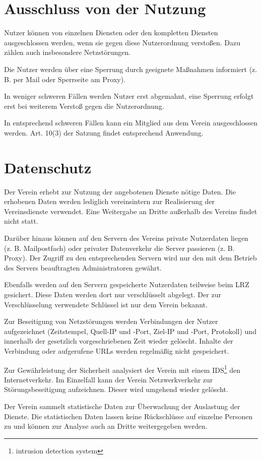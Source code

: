 \documentclass[a4paper,10pt]{scrartcl}
\begin{document}
\section{Ausschluss von der Nutzung}
Nutzer können von einzelnen Diensten oder den kompletten Diensten ausgeschlossen werden, wenn sie gegen diese Nutzerordnung verstoßen. Dazu zählen auch insbesondere Netzstörungen.

Die Nutzer werden über eine Sperrung durch geeignete Maßnahmen informiert (z. B. per Mail oder Sperrseite am Proxy).

In weniger schweren Fällen werden Nutzer erst abgemahnt, eine Sperrung erfolgt erst bei weiterem Verstoß gegen die Nutzerordnung.

In entsprechend schweren Fällen kann ein Mitglied aus dem Verein ausgeschlossen werden. Art. 10(3) der Satzung findet entsprechend Anwendung. 

\section{Datenschutz}
Der Verein erhebt zur Nutzung der angebotenen Dienste nötige Daten. Die erhobenen Daten werden lediglich vereinsintern zur Realisierung der Vereinsdienste verwendet. Eine Weitergabe an Dritte außerhalb des Vereins findet nicht statt.

Darüber hinaus können auf den Servern des Vereins private Nutzerdaten liegen (z. B. Mailpostfach) oder privater Datenverkehr die Server passieren (z. B. Proxy). Der Zugriff zu den entsprechenden Servern wird nur den mit dem Betrieb des Servers beauftragten Administratoren gewährt.

Ebenfalls werden auf den Servern gespeicherte Nutzerdaten teilweise beim LRZ gesichert. Diese Daten werden dort nur verschlüsselt abgelegt. Der zur Verschlüsselung verwendete Schlüssel ist nur dem Verein bekannt.

Zur Beseitigung von Netzstörungen werden Verbindungen der Nutzer aufgezeichnet (Zeitstempel, Quell-IP und -Port, Ziel-IP und -Port, Protokoll) und innerhalb der gesetzlich vorgeschriebenen Zeit wieder gelöscht. Inhalte der Verbindung oder aufgerufene URLs werden regelmäßig nicht gespeichert.

Zur Gewährleistung der Sicherheit analysiert der Verein mit einem IDS\footnote{intrusion detection system} den Internetverkehr. Im Einzelfall kann der Verein Netzwerkverkehr zur Störungsbeseitigung aufzeichnen. Dieser wird umgehend wieder gelöscht.

Der Verein sammelt statistische Daten zur Überwachung der Auslastung der Dienste. Die statistischen Daten lassen keine Rückschlüsse auf einzelne Personen zu und können zur Analyse auch an Dritte weitergegeben werden.
\end{document}
